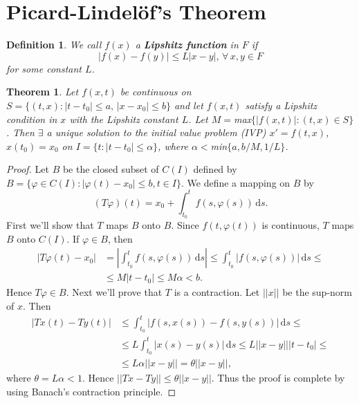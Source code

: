 \documentclass[12pt, a4paper]{article}
\newcommand{\rd}{\ensuremath{\mathrm{d}}}
\newcommand{\id}{\ensuremath{\,\rd}}
\newtheorem{theorem}{Theorem}[section]
\newtheorem{delfin}{Definition}[section]
\begin{document}
\section{Picard-Lindelöf's Theorem}
\begin{delfin}
We call $f(x)$ a \textbf{Lipshitz function} in $F$ if 
\begin{equation*}
|f(x)-f(y)|\leq L|x-y|,\, \forall\, x,y\in F
\end{equation*}
for some constant $L$.
\end{delfin}
\begin{theorem}
Let $f(x,t)$ be continuous on $S=\{(t,x) : |t-t_0| \leq a,\, |x-x_0|\leq b\}$ and let $f(x,t)$ satisfy a Lipshitz condition in $x$ with the Lipshitz constant $L$. Let $M=$\textnormal{max}$\{|f(x,t)| : (t,x)\in S\}$. Then $\exists$ a unique solution to the initial value problem (IVP) $x' = f(t,x)$, $x(t_0)=x_0$ on $I=\{t:|t-t_0|\leq \alpha\}$, where $\alpha <$\textnormal{min}$\{a,b/M,1/L\}$.
\end{theorem}

\begin{proof}
Let $B$ be the closed subset of $C(I)$ defined by $B=\{\varphi \in C(I) : |\varphi(t) - x_0|\leq b, t\in I\}$. We define a mapping on $B$ by
\begin{equation*}
(T\varphi)(t) = x_0 + \int_{t_0}^t f(s,\varphi(s))\id s.
\end{equation*}
First we'll show that $T$ maps $B$ onto $B$. Since $f(t,\varphi(t))$ is continuous, $T$ maps $B$ onto $C(I)$. If $\varphi \in B$, then
\begin{equation*}
\begin{split}
|T\varphi(t)-x_0| &= \left| \int_{t_0}^t f(s,\varphi(s))\id s\right| \leq \int_{t_0}^t \left | f(s,\varphi(s))\right|\id s \leq \\
&\leq M|t-t_0| \leq M\alpha < b.
\end{split}
\end{equation*}
Hence $T\varphi \in B$. Next we'll prove that $T$ is a contraction. Let $||x||$ be the sup-norm of $x$. Then
\begin{equation*}
\begin{split}
|Tx(t) - Ty(t)| &\leq \int_{t_0}^t \left|f(s,x(s)) - f(s,y(s)) \right|\id s \leq \\
& \leq L \int_{t_0}^t |x(s)-y(s)|\id s \leq L||x-y|||t-t_0| \leq \\
& \leq L\alpha||x-y|| = \theta||x-y||,
\end{split}
\end{equation*}
where $\theta = L\alpha <1$. Hence $||Tx-Ty||\leq \theta ||x-y||$. Thus the proof is complete by using Banach's contraction principle.
\end{proof}
\end{document}
